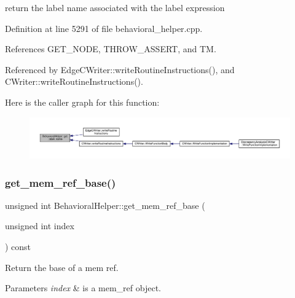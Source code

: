 return the label name associated with the label expression 



Definition at line 5291 of file behavioral\+\_\+helper.\+cpp.



References G\+E\+T\+\_\+\+N\+O\+DE, T\+H\+R\+O\+W\+\_\+\+A\+S\+S\+E\+RT, and TM.



Referenced by Edge\+C\+Writer\+::write\+Routine\+Instructions(), and C\+Writer\+::write\+Routine\+Instructions().

Here is the caller graph for this function\+:
\nopagebreak
\begin{figure}[H]
\begin{center}
\leavevmode
\includegraphics[width=350pt]{dd/db2/classBehavioralHelper_a28996a23af481bdf84e16fe884a596ff_icgraph}
\end{center}
\end{figure}
\mbox{\label{classBehavioralHelper_a2df88b4bc5b3891c8aa7b7a5109ca64f}} 
\subsubsection{\texorpdfstring{get\+\_\+mem\+\_\+ref\+\_\+base()}{get\_mem\_ref\_base()}}
{\footnotesize\ttfamily unsigned int Behavioral\+Helper\+::get\+\_\+mem\+\_\+ref\+\_\+base (\begin{DoxyParamCaption}\item[{unsigned int}]{index }\end{DoxyParamCaption}) const\hspace{0.3cm}{\ttfamily [virtual]}}



Return the base of a mem ref. 


\begin{DoxyParams}{Parameters}
{\em index} & is a mem\+\_\+ref object. \\
\hline
\end{DoxyParams}


